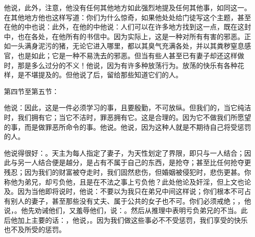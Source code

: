 他说，此外，注意，他没有任何其他地方如此强烈地提及任何其他事，如同这一。在其他地方他也这样写道：你们为什么惊奇，如果他处处给门徒写这个主题，甚至在他的中也说：此外，在他的中他说：人们可以在许多地方找到这一点，既在这封中，也在各处，在他所有的书信中。因为实际上，这是一种对所有有害的邪恶。正如一头满身泥污的猪，无论它进入哪里，都以其臭气充满各处，并以其粪秽窒息感官，也是如此；它是一种不易洗去的邪恶。但当有些人甚至已有妻子却还这样做时，那是多么过分的不义！他说，因为有许多种放荡行为。放荡的快乐有各种花样，是不堪提及的。但他说了后，留给那些知道它们的人。\par

第四节至第五节：\par

他说：因此，这是一件必须学习的事，且要殷勤，不可放纵。但我们的，当它纯洁时，我们拥有它；当它不洁时，罪恶拥有它。这是合理的。因为它不做我们所愿望的事，而是做罪恶所命令的事。他说。他说，因为这种人就是不期待自己将受惩罚的人。\par

 \par

他说得很好：。天主为每人指定了妻子，为天性划定了界限，即只与一人结合；因此与另一人结合便是越分，是占有不属于自己的东西，是抢夺；甚至比任何抢夺更残忍；因为我们的财富被夺走时，我们固然悲伤，但婚姻被侵犯时，悲伤更甚。你称他为弟兄，却亏负他，且是在不法之事上亏负他？此处他论及奸淫，但上文也论及。因为当他即将说时，他说：不要以为我只在弟兄中间这样说；你们根本不可占有别人的妻子，甚至那些没有丈夫、属于公共的女子也不可。你们必须戒绝；，他说，。他先劝诫他们，又羞辱他们，说：。然后从推理中表明亏负弟兄的不当。此后他加上主要的话：，他说，。因为我们做这些事必不不受惩罚，我们享受的快乐也不及所受的惩罚。\par

